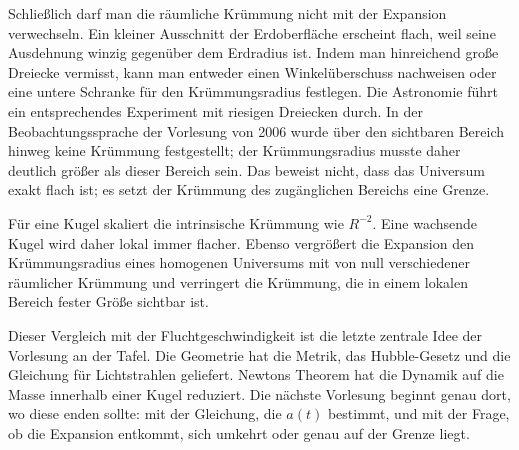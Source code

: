 Schließlich darf man die räumliche Krümmung nicht mit der Expansion verwechseln. Ein kleiner Ausschnitt der Erdoberfläche erscheint flach, weil seine Ausdehnung winzig gegenüber dem Erdradius ist. Indem man hinreichend große Dreiecke vermisst, kann man entweder einen Winkelüberschuss nachweisen oder eine untere Schranke für den Krümmungsradius festlegen. Die Astronomie führt ein entsprechendes Experiment mit riesigen Dreiecken durch. In der Beobachtungssprache der Vorlesung von 2006 wurde über den sichtbaren Bereich hinweg keine Krümmung festgestellt; der Krümmungsradius musste daher deutlich größer als dieser Bereich sein. Das beweist nicht, dass das Universum exakt flach ist; es setzt der Krümmung des zugänglichen Bereichs eine Grenze.

Für eine Kugel skaliert die intrinsische Krümmung wie \(R^{-2}\). Eine wachsende Kugel wird daher lokal immer flacher. Ebenso vergrößert die Expansion den Krümmungsradius eines homogenen Universums mit von null verschiedener räumlicher Krümmung und verringert die Krümmung, die in einem lokalen Bereich fester Größe sichtbar ist.

\begin{classroomqa}
\end{classroomqa}

Dieser Vergleich mit der Fluchtgeschwindigkeit ist die letzte zentrale Idee der Vorlesung an der Tafel. Die Geometrie hat die Metrik, das Hubble-Gesetz und die Gleichung für Lichtstrahlen geliefert. Newtons Theorem hat die Dynamik auf die Masse innerhalb einer Kugel reduziert. Die nächste Vorlesung beginnt genau dort, wo diese enden sollte: mit der Gleichung, die \(a(t)\) bestimmt, und mit der Frage, ob die Expansion entkommt, sich umkehrt oder genau auf der Grenze liegt.